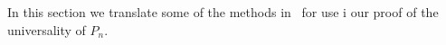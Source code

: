 In this section we translate some of the methods in~\cite{goodwillieIII} for use i our proof of the universality of $P_n$.